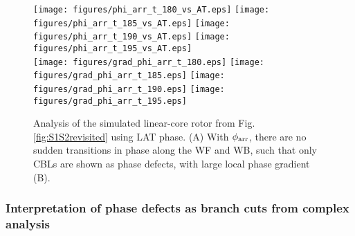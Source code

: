\documentclass{article}
\newcommand{\phiarr}{\ensuremath{\phi_{\rm arr}}}
\begin{document}
\begin{figure}
     \texttt{[image: figures/phi\_arr\_t\_180\_vs\_AT.eps]}
    \texttt{[image: figures/phi\_arr\_t\_185\_vs\_AT.eps]}
    \texttt{[image: figures/phi\_arr\_t\_190\_vs\_AT.eps]}
    \texttt{[image: figures/phi\_arr\_t\_195\_vs\_AT.eps]} \\
    
    \texttt{[image: figures/grad\_phi\_arr\_t\_180.eps]}
    \texttt{[image: figures/grad\_phi\_arr\_t\_185.eps]}
    \texttt{[image: figures/grad\_phi\_arr\_t\_190.eps]}
    \texttt{[image: figures/grad\_phi\_arr\_t\_195.eps]}
        \caption{Analysis of the simulated linear-core rotor from Fig. \ref{fig:S1S2revisited} using LAT phase. (A) With $\phiarr$, there are no sudden transitions in phase along the WF and WB, such that only CBLs are shown as phase defects, with large local phase gradient (B).  }
    \label{fig:S1S2revisited_phiarr}
\end{figure}

\subsubsection{Interpretation of phase defects as branch cuts from complex analysis}

\end{document}
